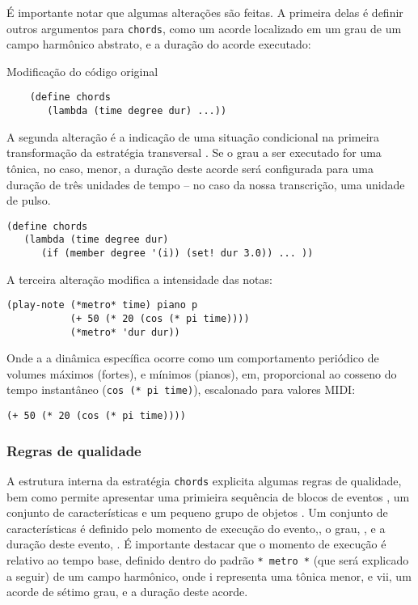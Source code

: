  É importante notar que algumas alterações são feitas. A primeira delas é definir outros argumentos para \verb|chords|, como um acorde localizado em um grau de um campo harmônico abstrato, e a duração do acorde executado:

\begin{example}{Modificação do código original}
\begin{verbatim}
    (define chords
       (lambda (time degree dur) ...))
\end{verbatim}


A segunda alteração é a indicação de uma situação condicional na primeira transformação da estratégia transversal . Se o grau a ser executado for uma tônica, no caso, menor, a duração deste acorde será configurada para uma duração de três unidades de tempo -- no caso da nossa transcrição, uma unidade de pulso.

\begin{verbatim}
(define chords
   (lambda (time degree dur)
      (if (member degree '(i)) (set! dur 3.0)) ... ))
\end{verbatim}

A terceira alteração modifica a intensidade das notas:

\begin{verbatim}
(play-note (*metro* time) piano p
           (+ 50 (* 20 (cos (* pi time))))
           (*metro* 'dur dur))
\end{verbatim}

Onde a a dinâmica específica ocorre como um comportamento periódico de volumes máximos (fortes), e mínimos (pianos), em, proporcional ao cosseno do tempo instantâneo (\verb|cos (* pi time)|), escalonado para valores MIDI:

\begin{verbatim}
(+ 50 (* 20 (cos (* pi time))))
\end{verbatim}
\end{example}

\subsubsection{Regras de qualidade}\label{sec:regras_qualidade}

A estrutura interna da estratégia \verb|chords| explicita algumas regras de qualidade, bem como permite apresentar uma primieira sequência de blocos de eventos , um conjunto de características  e um pequeno grupo de objetos . Um conjunto de características é definido pelo momento de execução do evento,, o grau, , e a duração deste evento, . É importante destacar que o momento de execução é relativo ao tempo base, definido dentro do padrão \verb|* metro *| (que será explicado a seguir) de um campo harmônico, onde i representa uma tônica menor, e vii, um acorde de sétimo grau, e a duração deste acorde.

